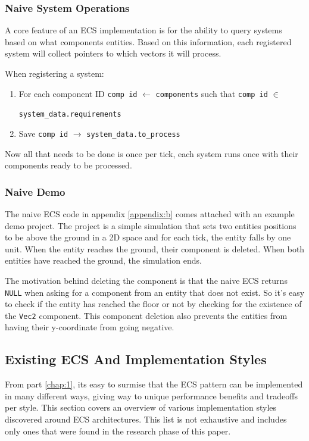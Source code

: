 \subsubsection{Naive System Operations}
A core feature of an ECS implementation is for the ability to query systems based on what components entities. Based on this information, each registered system will collect pointers to which vectors it will process.

When registering a system:
\begin{enumerate}
    \item For each component ID \texttt{comp id} $\leftarrow$ \texttt{components} such that \texttt{comp id} $\in$ 
    
    \texttt{system\_data.requirements}
    \item Save \texttt{comp id} $\rightarrow$ \texttt{system\_data.to\_process }
\end{enumerate}

Now all that needs to be done is once per tick, each system runs once with their components ready to be processed.

\subsubsection{Naive Demo}
The naive ECS code in appendix \ref{appendix:b} comes attached with an example demo project. The project is a simple simulation that sets two entities positions to be above the ground in a 2D space and for each tick, the entity falls by one unit. When the entity reaches the ground, their component is deleted. When both entities have reached the ground, the simulation ends. 

The motivation behind deleting the component is that the naive ECS returns \texttt{NULL} when asking for a component from an entity that does not exist. So it's easy to check if the entity has reached the floor or not by checking for the existence of the \texttt{Vec2} component. This component deletion also prevents the entities from having their y-coordinate from going negative.

\subsection{Existing ECS And Implementation Styles}
From part \ref{chap:1}, its easy to surmise that the ECS pattern can be implemented in many different ways, giving way to unique performance benefits and tradeoffs per style. This section covers an overview of various implementation styles discovered around ECS architectures. This list is not exhaustive and includes only ones that were found in the research phase of this paper. 

